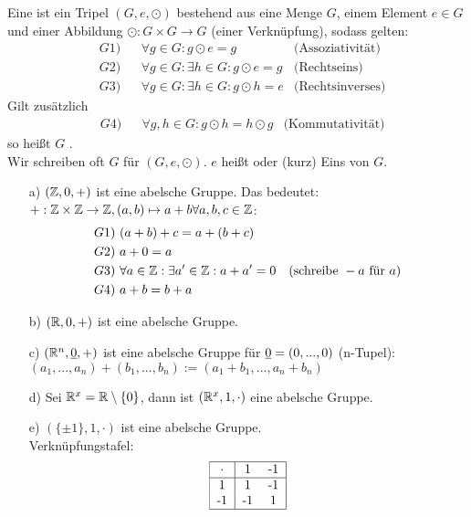 
\begin{defi}
	Eine  ist ein Tripel $(G,e,\odot)$ bestehend aus eine Menge $G$, einem Element $e\in G$ und einer Abbildung $\odot:G\times G\rightarrow G$ (einer Verknüpfung), sodass gelten:
	\begin{align*}
	&G1) && \forall g\in G:g\odot e=g & \text{(Assoziativität)}\\
	&G2) && \forall g\in G:\exists h\in G:g\odot e=g & \text{(Rechtseins)}\\
	&G3) && \forall g\in G:\exists h\in G:g\odot h=e & \text{(Rechtsinverses)}
	\end{align*}
	Gilt zusätzlich
	\begin{align*}
	&G4) && \forall g,h\in G:g\odot h=h\odot g & \text{(Kommutativität)}
	\end{align*}
	so heißt $G$ . \\
	Wir schreiben oft $G$ für $(G,e,\odot)$. $e$ heißt  oder (kurz) Eins von $G$.
\end{defi}

\begin{bsp}
	\begin{itemize}
		\item[a)] $(\mathbb{Z},0,+)$ ist eine abelsche Gruppe. Das bedeutet: $+:\mathbb{Z}\times\mathbb{Z}\rightarrow\mathbb{Z},(a,b)\mapsto a+b\\
		\forall a,b,c\in\mathbb{Z}$:
		\begin{align*}
		G1)\ & (a+b)+c=a+(b+c)\\
		G2)\ & a+0=a \\
		G3)\ & \forall a\in\mathbb{Z}:\exists a'\in\mathbb{Z}: a+a'=0 &  \text{(schreibe }-a\text{ für }a) \\
		G4)\ & a+b=b+a
		\end{align*}
		\item[b)] $(\mathbb{R},0,+)$ ist eine abelsche Gruppe.
		\item[c)]  $(\RR^{n},\uline{0},+)$ ist eine abelsche Gruppe für $\uline{0}=(0,...,0)$ (n-Tupel): $(a_{1},...,a_{n})+(b_{1},...,b_{n}):=(a_{1}+b_{1},...,a_{n}+b_{n})$
		\item[d)] Sei $\mathbb{R}^{x}=\mathbb{R}\setminus\{0\}$, dann ist $(\mathbb{R}^{x},1,\cdot)$ eine abelsche Gruppe.
		\item[e)] $(\{\pm 1\},1,\cdot)$ ist eine abelsche Gruppe. \\
		Verknüpfungstafel:
		\[
		\begin{tabular}{|c|cc|}
		\hline
		$\cdot$ & 1 & -1\\
		\hline
		1 & 1 & -1\\
		-1 & -1 & 1\\
		\hline
		\end{tabular}
		\]
	\end{itemize}
\end{bsp}

